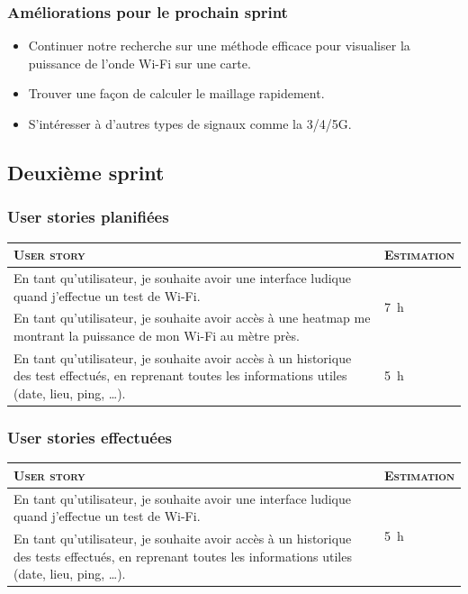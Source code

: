 \documentclass{elsarticle}
\newcommand{\est}[1]{\multirow{2}{*}{\SI{#1}{\hour}}}
\begin{document}
\subsubsection{Améliorations pour le prochain sprint}
\begin{itemize}
	\item Continuer notre recherche sur une méthode efficace pour visualiser la puissance de l’onde Wi-Fi sur une carte.
	\item Trouver une façon de calculer le maillage rapidement.
	\item S’intéresser à d’autres types de signaux comme la 3/4/5G.
\end{itemize}

\subsection{Deuxième sprint}
\subsubsection{User stories planifiées}
\begin{table}[H]
	\centering
	\begin{tabular}{p{14cm}m{2cm}}
		\toprule
		\textsc{User story} & \textsc{Estimation}\\
		\midrule
		En tant qu'utilisateur, je souhaite avoir une interface ludique quand j'effectue un test de Wi-Fi. & \est{7}\\
		\midrule
		En tant qu'utilisateur, je souhaite avoir accès à une heatmap me montrant la puissance de mon Wi-Fi au mètre près. & \est{30}\\
		\midrule
		En tant qu'utilisateur, je souhaite avoir accès à un historique des test effectués, en reprenant toutes les informations utiles (date, lieu, ping, \ldots). & \est{5}\\
		\bottomrule
	\end{tabular}
\end{table}

\subsubsection{User stories effectuées}
\begin{table}[H]
	\centering
	\begin{tabular}{p{14cm}m{2cm}}
		\toprule
		\textsc{User story} & \textsc{Estimation}\\
		\midrule
		En tant qu'utilisateur, je souhaite avoir une interface ludique quand j'effectue un test de Wi-Fi. & \est{5}\\
		\midrule
		En tant qu'utilisateur, je souhaite avoir accès à un historique des tests effectués, en reprenant toutes les informations utiles (date, lieu, ping, \ldots). & \est{7}\\
		\bottomrule
	\end{tabular}
\end{table}
\end{document}

